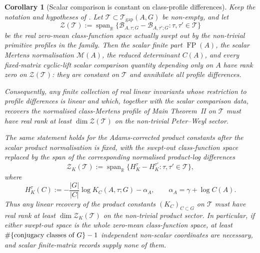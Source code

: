 \documentclass[11pt,a4paper]{amsart}
\theoremstyle{plain}
\newtheorem{corollary}[theorem]{Corollary}
\theoremstyle{definition}
\theoremstyle{remark}
\DeclareMathOperator{\FP}{FP}
\begin{document}
\begin{corollary}[Scalar comparison is constant on class-profile differences]
  \label{cor:scalar-record-rank-zero-bound}
  Keep the notation and hypotheses of
  .  Let
  \(\mathscr T\subset\mathcal T_{\mathrm{gap}}(A,G)\) be non-empty, and let
  \[
    \mathcal Z(\mathscr T)
    :=
    \operatorname{span}_{\mathbb{R}}
    \{\mathcal B_{A,\tau;G}-\mathcal B_{A,\tau';G}:
        \tau,\tau'\in\mathscr T\}
  \]
  be the real zero-mean class-function space actually swept out by the
  non-trivial primitive profiles in the family.  Then the scalar finite part
  \(\FP(A)\), the scalar Mertens normalisation \(\mathcal M(A)\), the reduced
  determinant \(C(A)\), and every fixed-matrix cyclic-lift scalar comparison
  quantity depending only on \(A\) have rank zero on
  \(\mathcal Z(\mathscr T)\): they are constant on \(\mathscr T\) and
  annihilate all profile differences.

  Consequently, any finite collection of real linear invariants whose
  restriction to profile differences is linear and which, together with the
  scalar comparison data, recovers the normalised class-Mertens profile of Main
  Theorem~II on \(\mathscr T\) must have real rank at least
  \(\dim\mathcal Z(\mathscr T)\) on the non-trivial Peter--Weyl sector.

  The same statement holds for the Adams-corrected product constants after the
  scalar product normalisation is fixed, with the swept-out class-function space
  replaced by the span of the corresponding normalised product-log differences
  \[
    \mathcal Z_K(\mathscr T)
    :=
    \operatorname{span}_{\mathbb{R}}
    \{H_K^{\tau}-H_K^{\tau'}:
        \tau,\tau'\in\mathscr T\},
  \]
  where
  \[
    H_K^{\tau}(C):=-\frac{|G|}{|C|}\log K_C(A,\tau;G)-\alpha_A,
    \qquad
    \alpha_A=\gamma+\log C(A).
  \]
  Thus any linear recovery of the product
  constants \((K_C)_{C\subset G}\) on \(\mathscr T\) must have real rank at
  least \(\dim\mathcal Z_K(\mathscr T)\) on the non-trivial product sector.
  In particular, if either swept-out space is the whole zero-mean
  class-function space, at least
  \(\#\{\textup{conjugacy classes of }G\}-1\) independent non-scalar
  coordinates are necessary, and scalar finite-matrix records supply none of
  them.
\end{corollary}
\end{document}
